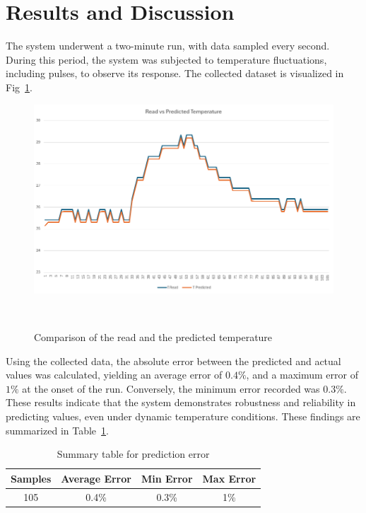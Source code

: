 \section{Results and Discussion}
The system underwent a two-minute run, with data sampled every second. During this period, the system was subjected to temperature fluctuations, including pulses, to observe its response. The collected dataset is visualized in Fig~\ref{fig:t_plot}.

\begin{figure}[H]
    \centering
    \includegraphics[width=1\linewidth]{figures/t_plot.png}
    \caption{Comparison of the read and the predicted temperature}
~\label{fig:t_plot}
\end{figure}

Using the collected data, the absolute error between the predicted and actual values was calculated, yielding an average error of $0.4\%$, and a maximum error of $1\%$ at the onset of the run. Conversely, the minimum error recorded was $0.3\%$. These results indicate that the system demonstrates robustness and reliability in predicting values, even under dynamic temperature conditions. These findings are summarized in Table~\ref{tab:error_table}.

\begin{table}[H]
\centering
    \begin{tabular}{|c|c|c|c|}
    \hline
    Samples & Average Error & Min Error & Max Error \\ \hline
      105   &     0.4\%     &   0.3\%   &    1\%    \\ \hline
    \end{tabular}
\caption{Summary table for prediction error}
\label{tab:error_table}
\end{table}
